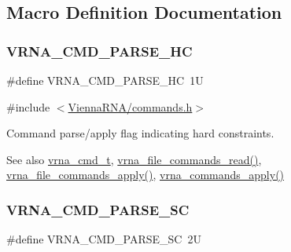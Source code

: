 \subsection{Macro Definition Documentation}
\mbox{\label{group__command__files_gac54dec838d7b6bebd5df85f71702d324}} 
\subsubsection{\texorpdfstring{V\+R\+N\+A\+\_\+\+C\+M\+D\+\_\+\+P\+A\+R\+S\+E\+\_\+\+HC}{VRNA\_CMD\_PARSE\_HC}}
{\footnotesize\ttfamily \#define V\+R\+N\+A\+\_\+\+C\+M\+D\+\_\+\+P\+A\+R\+S\+E\+\_\+\+HC~1U}



{\ttfamily \#include $<$\hyperlink{commands_8h}{Vienna\+R\+N\+A/commands.\+h}$>$}



Command parse/apply flag indicating hard constraints. 

\begin{DoxySeeAlso}{See also}
\hyperlink{group__command__files_gaf31afe4c5f8e4bf44a670ab4c3dcd916}{vrna\+\_\+cmd\+\_\+t}, \hyperlink{group__command__files_gae5f56400ed43683338f7bf1c1102655a}{vrna\+\_\+file\+\_\+commands\+\_\+read()}, \hyperlink{group__command__files_gadbe8c9622f7bcc6dcbe3448b98df8656}{vrna\+\_\+file\+\_\+commands\+\_\+apply()}, \hyperlink{group__command__files_gac65d0fe86f7671a2d2b85dda1a3ddc16}{vrna\+\_\+commands\+\_\+apply()} 
\end{DoxySeeAlso}
\mbox{\label{group__command__files_ga8cad3c1f83e6f149829c49a186a83e21}} 
\subsubsection{\texorpdfstring{V\+R\+N\+A\+\_\+\+C\+M\+D\+\_\+\+P\+A\+R\+S\+E\+\_\+\+SC}{VRNA\_CMD\_PARSE\_SC}}
{\footnotesize\ttfamily \#define V\+R\+N\+A\+\_\+\+C\+M\+D\+\_\+\+P\+A\+R\+S\+E\+\_\+\+SC~2U}



